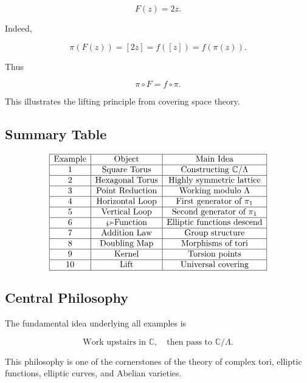 \documentclass[12pt,a4paper]{article}
\theoremstyle{notespace}
\begin{document}
\[
F(z)
=
2z.
\]

Indeed,

\[
\pi(F(z))
=
[2z]
=
f([z])
=
f(\pi(z)).
\]

Thus

\[
\boxed{
	\pi\circ F
	=
	f\circ\pi.
}
\]

This illustrates the lifting principle from covering space theory.

\subsection{Summary Table}

\[
\begin{array}{|c|c|c|}
	\hline
	\text{Example} & \text{Object} & \text{Main Idea}\\
	\hline
	1 & \text{Square Torus} & \text{Constructing } \mathbb C/\Lambda\\
	\hline
	2 & \text{Hexagonal Torus} & \text{Highly symmetric lattice}\\
	\hline
	3 & \text{Point Reduction} & \text{Working modulo }\Lambda\\
	\hline
	4 & \text{Horizontal Loop} & \text{First generator of }\pi_1\\
	\hline
	5 & \text{Vertical Loop} & \text{Second generator of }\pi_1\\
	\hline
	6 & \wp\text{-Function} & \text{Elliptic functions descend}\\
	\hline
	7 & \text{Addition Law} & \text{Group structure}\\
	\hline
	8 & \text{Doubling Map} & \text{Morphisms of tori}\\
	\hline
	9 & \text{Kernel} & \text{Torsion points}\\
	\hline
	10 & \text{Lift} & \text{Universal covering}\\
	\hline
\end{array}
\]

\subsection{Central Philosophy}

The fundamental idea underlying all examples is

\[
\boxed{
	\text{Work upstairs in }
	\mathbb C,
	\quad
	\text{then pass to }
	\mathbb C/\Lambda.
}
\]

This philosophy is one of the cornerstones of the theory of complex tori, elliptic functions, elliptic curves, and Abelian varieties.
\end{document}
